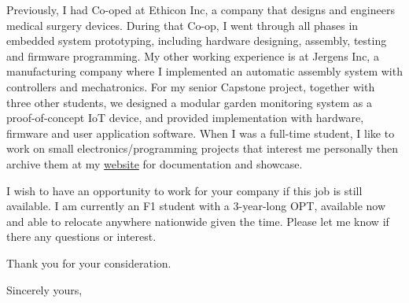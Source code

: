 \documentclass[11pt]{letter} %
\begin{document}
\begin{letter}
    \par Previously, I had Co-oped at Ethicon Inc, a company that designs and engineers medical surgery devices. During that Co-op, I went through all phases in embedded system prototyping, including hardware designing, assembly, testing and firmware programming.
    My other working experience is at Jergens Inc, a manufacturing company where I implemented an automatic assembly system with controllers and mechatronics.
    For my senior Capstone project, together with three other students, we designed a modular garden monitoring system as a proof-of-concept IoT device, and provided implementation with hardware, firmware and user application software.
    When I was a full-time student, I like to work on small electronics/programming projects that interest me personally then archive them at my \href{https://liu2z2.github.io/}{website} for documentation and showcase.

    \par I wish to have an opportunity to work for your company if this job is still available.
    I am currently an F1 student with a 3-year-long OPT, available now and able to relocate anywhere nationwide given the time.
    Please let me know if there any questions or interest.

    \par Thank you for your consideration.

    \closing{Sincerely yours,}




\end{letter}
\end{document}
